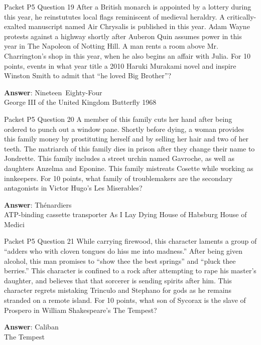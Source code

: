 \begin{frame}{Packet P5 Question 19}
After a British monarch is appointed by a   lottery during this year, he reinstututes local flags reminiscent of medieval heraldry. A critically-exalted manuscript named Air Chrysalis is published in this   year. Adam Wayne protests against a highway shortly after Auberon Quin assumes power in this year in The Napoleon of Notting Hill. A man rents a room above Mr. Charrington's shop   in this year, when he also begins an affair with Julia. For 10 points, events in what year title a 2010 Haruki Murakami novel and inspire Winston Smith to admit that “he loved Big   Brother”?  

\textbf{Answer}: Nineteen\ Eighty-Four\\
 George III of the United Kingdom
 Butterfly
 1968
\end{frame}

\begin{frame}{Packet P5 Question 20}
A member of this family   cuts her hand after being ordered to punch out a window pane. Shortly before dying, a woman provides this family money by prostituting herself and by selling her hair and two of her teeth. The matriarch of this family dies in prison after they change their name to Jondrette. This family includes a street urchin named Gavroche, as well as daughters Anzelma and Eponine. This family mistreats Cosette while working as innkeepers. For 10 points, what family of troublemakers are the secondary antagonists in Victor Hugo’s Les Miserables?      

\textbf{Answer}: Thénardiers\\
 ATP-binding cassette transporter
 As I Lay Dying
 House of Habsburg
 House of Medici
\end{frame}

\begin{frame}{Packet P5 Question 21}
While carrying firewood, this character laments a group of “adders who with cloven tongues do hiss me into madness.” After being given alcohol, this man promises to “show thee the best springs” and “pluck thee berries.” This character is confined to a rock after attempting to rape his master’s daughter, and believes that that sorcerer is sending spirits after him. This character regrets mistaking Trinculo and Stephano for gods as he remains stranded on a remote island. For 10 points, what son of Sycorax is the slave     of Prospero in William     Shakespeare’s The Tempest?

\textbf{Answer}: Caliban\\
 The Tempest
\end{frame}

